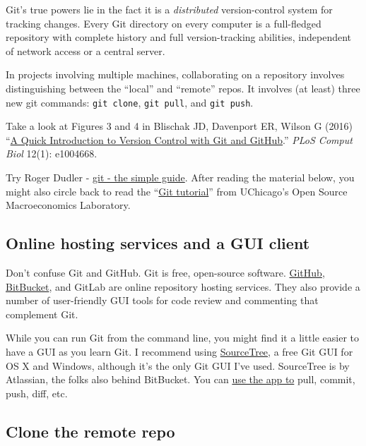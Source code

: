 
Git's true powers lie in the fact it is a \textit{distributed} version-control system for tracking changes.
Every Git directory on every computer is a full-fledged repository with complete history and full version-tracking abilities, independent of network access or a central server.

In projects involving multiple machines,
collaborating on a repository involves distinguishing between the ``local'' and ``remote'' repos.
It involves (at least) three new git commands: \texttt{git clone}, \texttt{git pull}, and \texttt{git push}.

Take a look at Figures 3 and 4 in
Blischak JD, Davenport ER, Wilson G (2016) 
``\href{http://journals.plos.org/ploscompbiol/article?id=10.1371/journal.pcbi.1004668}{A Quick Introduction to Version Control with Git and GitHub}.'' \textit{PLoS Comput Biol} 12(1): e1004668.

Try Roger Dudler - \href{http://rogerdudler.github.io/git-guide/}{git - the simple guide}.
After reading the material below, you might also circle back to read
the ``\href{https://github.com/OpenSourceMacro/BootCamp2017/blob/master/Tutorials/git_tutorial.pdf}{Git tutorial}''
from UChicago's Open Source Macroeconomics Laboratory.

\subsection{Online hosting services and a GUI client}

Don't confuse Git and GitHub.
Git is free, open-source software.
\href{http://www.github.com}{GitHub}, \href{https://bitbucket.org/}{BitBucket}, and GitLab are
online repository hosting services.
They also provide a number of user-friendly GUI tools for code review and commenting that complement Git.

While you can run Git from the command line,
you might find it a little easier to have a GUI as you learn Git.
I recommend using \href{https://www.sourcetreeapp.com/}{SourceTree},
a free Git GUI for OS X and Windows, although it's the only Git GUI I've used.
SourceTree is by Atlassian, the folks also behind BitBucket.
You can \href{https://confluence.atlassian.com/get-started-with-sourcetree/work-using-git-847359053.html}{use the app to} pull, commit, push, diff, etc.

\subsection{Clone the remote repo}

